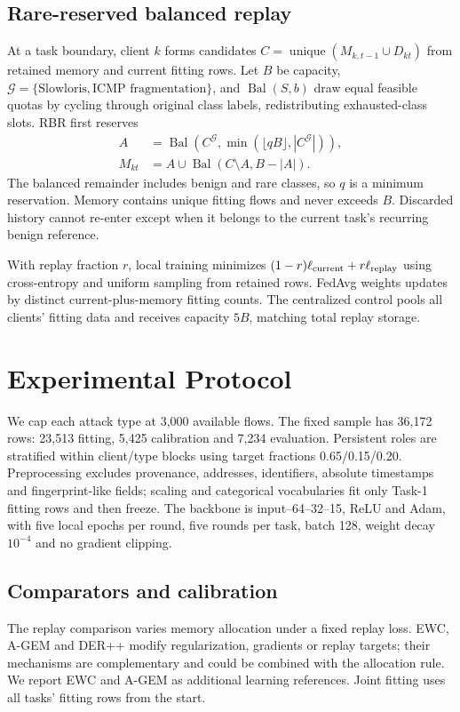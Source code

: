 \documentclass[journal,10pt]{IEEEtran}
\begin{document}
\subsection{Rare-reserved balanced replay}
At a task boundary, client $k$ forms candidates $C=\operatorname{unique}(M_{k,t-1}\cup D_{kt})$ from retained memory and current fitting rows. Let $B$ be capacity, $\mathcal G=\{\text{Slowloris},\text{ICMP fragmentation}\}$, and $\operatorname{Bal}(S,b)$ draw equal feasible quotas by cycling through original class labels, redistributing exhausted-class slots. RBR first reserves
\begin{align}
A&=\operatorname{Bal}(C^{\mathcal G},\min(\lfloor qB\rfloor,|C^{\mathcal G}|)),\\
M_{kt}&=A\cup\operatorname{Bal}(C\setminus A,B-|A|).
\end{align}
The balanced remainder includes benign and rare classes, so $q$ is a minimum reservation. Memory contains unique fitting flows and never exceeds $B$. Discarded history cannot re-enter except when it belongs to the current task's recurring benign reference.

With replay fraction $r$, local training minimizes $(1-r)\ell_{\rm current}+r\ell_{\rm replay}$ using cross-entropy and uniform sampling from retained rows. FedAvg weights updates by distinct current-plus-memory fitting counts. The centralized control pools all clients' fitting data and receives capacity $5B$, matching total replay storage.

\section{Experimental Protocol}
We cap each attack type at 3,000 available flows. The fixed sample has 36,172 rows: 23,513 fitting, 5,425 calibration and 7,234 evaluation. Persistent roles are stratified within client/type blocks using target fractions 0.65/0.15/0.20. Preprocessing excludes provenance, addresses, identifiers, absolute timestamps and fingerprint-like fields; scaling and categorical vocabularies fit only Task-1 fitting rows and then freeze. The backbone is input--64--32--15, ReLU and Adam, with five local epochs per round, five rounds per task, batch 128, weight decay $10^{-4}$ and no gradient clipping.

\subsection{Comparators and calibration}
The replay comparison varies memory allocation under a fixed replay loss. EWC, A-GEM and DER++ modify regularization, gradients or replay targets; their mechanisms are complementary and could be combined with the allocation rule. We report EWC and A-GEM as additional learning references. Joint fitting uses all tasks' fitting rows from the start.
\end{document}
